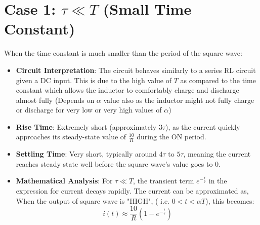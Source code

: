 \documentclass[12pt,a4paper]{report}
\begin{document}
\section{Case 1: $\tau \ll T$ (Small Time Constant)}
When the time constant is much smaller than the period of the square wave:

\begin{itemize}
    \item \textbf{Circuit Interpretation}: The circuit behaves similarly to a series RL circuit given a DC input. This is due to the high value of $T$ as compared to the time constant which allows the inductor to comfortably charge and discharge almost fully (Depends on $\alpha$ value also as the inductor might not fully charge or discharge for very low or very high values of $\alpha$) 
    \item \textbf{Rise Time}: Extremely short (approximately $3\tau$), as the current quickly approaches its steady-state value of $\frac{10}{R}$ during the ON period.
    \item \textbf{Settling Time}: Very short, typically around $4\tau$ to $5\tau$, meaning the current reaches steady state well before the square wave's value goes to $0$.
    \item \textbf{Mathematical Analysis}: For $\tau \ll T$, the transient term $e^{-\frac{t}{\tau}}$ in the expression for current decays rapidly. The current can be approximated as,\\     
    When the output of square wave is "HIGH", ( i.e. $0 < t < \alpha T$), this becomes:
    \begin{equation}
    i(t) \approx \frac{10}{R}(1 - e^{-\frac{t}{\tau}})
    \end{equation}
    

\end{itemize}
\end{document}

